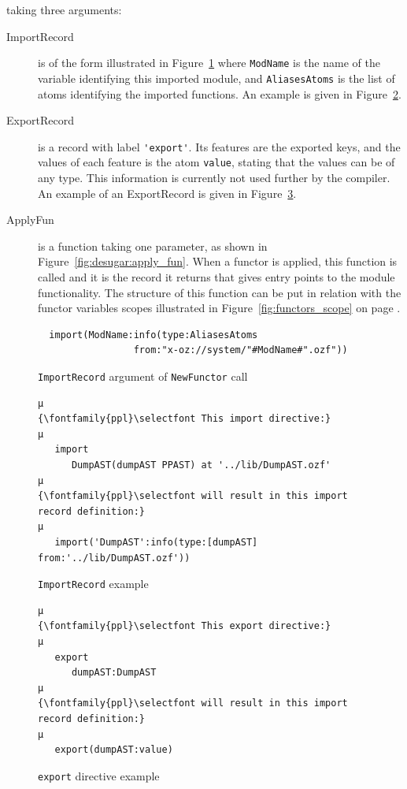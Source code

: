 \documentclass[a4paper]{memoir}
\begin{document}
taking three arguments:
\begin{description}
  \item[ImportRecord] is of the form  illustrated in
    Figure~\ref{fig:desugar:import_record}
    where \lstinline!ModName! is the name
    of the variable identifying this imported module, and
    \lstinline!AliasesAtoms! is the list of atoms identifying the imported
    functions. An example is given in Figure~\ref{fig:desugar:import_record_example}.
  \item[ExportRecord] is a record with label \lstinline!'export'!. Its features are the
    exported keys, and the values of each feature is the atom \lstinline!value!, stating that the values can be of any type. 
     This information is currently not used further by the compiler. An example of an ExportRecord is given in Figure~\ref{fig:desugar:export_record}.
  \item[ApplyFun] is a function taking one parameter, as shown in
    Figure~\ref{fig:desugar:apply_fun}. When a functor is applied, this function is called
    and it is the record it returns that gives entry points to the module
    functionality. The structure of this function can be put in relation with
    the functor variables scopes illustrated in Figure~\ref{fig:functors_scope}
    on page \pageref{fig:functors_scope}.
\end{description}

\begin{figure}[ht]
\begin{lstlisting}
  import(ModName:info(type:AliasesAtoms 
                 from:"x-oz://system/"#ModName#".ozf")) 
\end{lstlisting}
\caption{\lstinline!ImportRecord! argument of \lstinline!NewFunctor! call}
\label{fig:desugar:import_record}
\end{figure}


\begin{figure}[ht]
\begin{lstlisting}
µ
{\fontfamily{ppl}\selectfont This import directive:}
µ
   import
      DumpAST(dumpAST PPAST) at '../lib/DumpAST.ozf'
µ
{\fontfamily{ppl}\selectfont will result in this import record definition:}
µ
   import('DumpAST':info(type:[dumpAST] from:'../lib/DumpAST.ozf'))
\end{lstlisting}
\caption{\lstinline!ImportRecord! example}
\label{fig:desugar:import_record_example}
\end{figure}

\begin{figure}[h]
\begin{lstlisting}
µ
{\fontfamily{ppl}\selectfont This export directive:}
µ
   export
      dumpAST:DumpAST
µ
{\fontfamily{ppl}\selectfont will result in this import record definition:}
µ
   export(dumpAST:value)
\end{lstlisting}
\caption{\lstinline!export! directive example}
\label{fig:desugar:export_record}
\end{figure}
\end{document}
